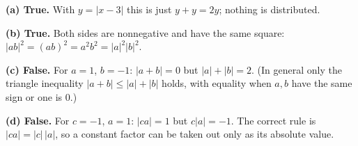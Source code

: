 \textbf{(a) True.} With $y=|x-3|$ this is just $y+y=2y$; nothing is distributed.

\textbf{(b) True.} Both sides are nonnegative and have the same square: $|ab|^2=(ab)^2=a^2b^2=|a|^2|b|^2$.

\textbf{(c) False.} For $a=1$, $b=-1$: $|a+b|=0$ but $|a|+|b|=2$. (In general only the triangle inequality $|a+b|\le|a|+|b|$ holds, with equality when $a,b$ have the same sign or one is $0$.)

\textbf{(d) False.} For $c=-1$, $a=1$: $|ca|=1$ but $c|a|=-1$. The correct rule is $|ca|=|c|\,|a|$, so a constant factor can be taken out only as its absolute value.
